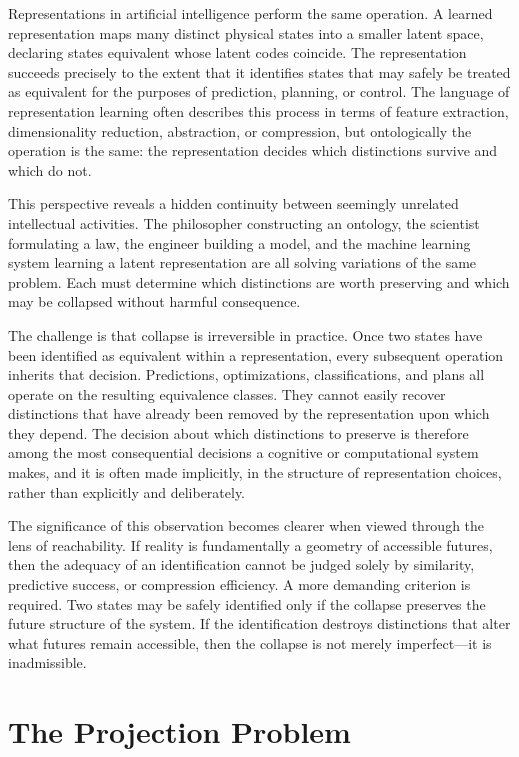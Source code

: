 \documentclass[12pt,a4paper]{article}
\theoremstyle{plain}
\theoremstyle{definition}
\theoremstyle{remark}
\begin{document}
Representations in artificial intelligence perform the same operation. A
learned representation maps many distinct physical states into a smaller
latent space, declaring states equivalent whose latent codes coincide. The
representation succeeds precisely to the extent that it identifies states
that may safely be treated as equivalent for the purposes of prediction,
planning, or control. The language of representation learning often describes
this process in terms of feature extraction, dimensionality reduction,
abstraction, or compression, but ontologically the operation is the same: the
representation decides which distinctions survive and which do not.

This perspective reveals a hidden continuity between seemingly unrelated
intellectual activities. The philosopher constructing an ontology, the
scientist formulating a law, the engineer building a model, and the machine
learning system learning a latent representation are all solving variations
of the same problem. Each must determine which distinctions are worth
preserving and which may be collapsed without harmful consequence.

The challenge is that collapse is irreversible in practice. Once two states
have been identified as equivalent within a representation, every subsequent
operation inherits that decision. Predictions, optimizations, classifications,
and plans all operate on the resulting equivalence classes. They cannot
easily recover distinctions that have already been removed by the
representation upon which they depend. The decision about which distinctions
to preserve is therefore among the most consequential decisions a cognitive or
computational system makes, and it is often made implicitly, in the structure
of representation choices, rather than explicitly and deliberately.

The significance of this observation becomes clearer when viewed through the
lens of reachability. If reality is fundamentally a geometry of accessible
futures, then the adequacy of an identification cannot be judged solely by
similarity, predictive success, or compression efficiency. A more demanding
criterion is required. Two states may be safely identified only if the
collapse preserves the future structure of the system. If the identification
destroys distinctions that alter what futures remain accessible, then the
collapse is not merely imperfect---it is inadmissible.

\section{The Projection Problem}
\end{document}
